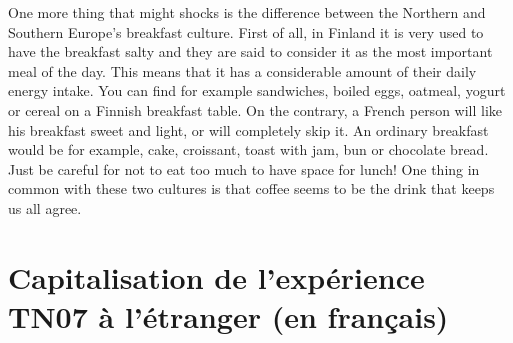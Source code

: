 \documentclass[a4paper,12pt]{report} %
\begin{document}
{One more thing that might shocks is the difference between the Northern and Southern Europe’s breakfast culture. First of all, in Finland it is very used to have the breakfast salty and they are said to consider it as the most important meal of the day. This means that it has a considerable amount of their daily energy intake. You can find for example sandwiches, boiled eggs, oatmeal, yogurt or cereal on a Finnish breakfast table.
On the contrary, a French person will like his breakfast sweet and light, or will completely skip it. An ordinary breakfast would be for example, cake, croissant, toast with jam, bun or chocolate bread. Just be careful for not to eat too much to have space for lunch! One thing in common with these two cultures is that coffee seems to be the drink that keeps us all agree. \newline}



\newpage
\part{Capitalisation de l’expérience TN07 à l'étranger (en français)}%
\label{pt:4}
\end{document}
